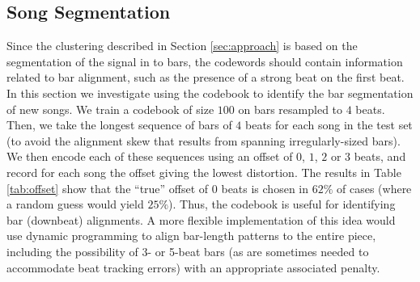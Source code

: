 \documentclass{article}
\begin{document}
\subsection{Song Segmentation} \label{ssec:segment}

Since the clustering described in Section \ref{sec:approach} is based
on the segmentation of the signal in to bars, 
the codewords should contain information related to bar
alignment, such as the presence of a strong beat on the first beat.
%
In this section we investigate using the codebook to identify the
bar segmentation of new songs.  
We train a codebook of size $100$ on bars resampled to $4$ beats. Then,
we take the longest sequence of bars of $4$ beats for each song
in the test set (to avoid the alignment skew that results from spanning 
irregularly-sized bars).  
We then encode each of these sequences using an offset
of $0$, $1$, $2$ or $3$ beats, and record for each song 
the offset giving the lowest distortion.  
%
The results in Table \ref{tab:offset}
show that the ``true'' offset of $0$ beats is chosen in $62\%$ of cases (where a random 
guess would yield $25\%$).  Thus, the codebook is useful for identifying bar (downbeat) 
alignments.  A more flexible implementation of this idea would use dynamic 
programming to align bar-length patterns to the entire piece, including the 
possibility of 3- or 5-beat bars (as are sometimes needed to accommodate 
beat tracking errors) with an appropriate associated penalty.  


\end{document}
